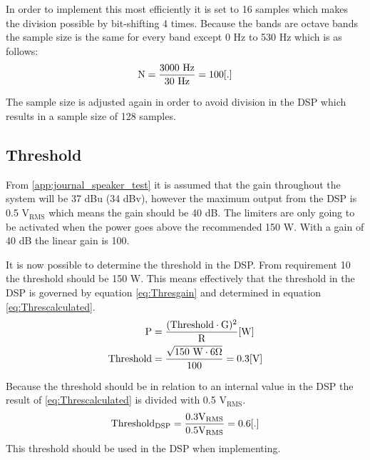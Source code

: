 In order to implement this most efficiently it is set to 16 samples which makes the division possible by bit-shifting 4 times. Because the bands are octave bands the sample size is the same for every band except 0 Hz to 530 Hz which is as follows:
\begin{equation}
\text{N} = \frac{3000 \text{ Hz}}{30 \text{ Hz}} = 100 \enhed{.}
\end{equation}

The sample size is adjusted again in order to avoid division in the DSP which results in a sample size of 128 samples. 

\subsection*{Threshold}
From \autoref{app:journal_speaker_test} it is assumed that the gain throughout the system will be 37 dBu (34 dBv), however the maximum output from the DSP is 0.5 $\text{V}_\text{RMS}$ which means the gain should be 40 dB. The limiters are only going to be activated when the power goes above the recommended 150 W. With a gain of 40 dB the linear gain is 100.

It is now possible to determine the threshold in the DSP. From requirement 10 the threshold should be 150 W.  This means effectively that the threshold in the DSP is governed by equation \ref{eq:Thresgain} and determined in equation \ref{eq:Threscalculated}.
\vspace{-3mm}
\begin{align}
\text{P}&=\frac{(\text{Threshold} \cdot \text{G})^2}{\text{R}} \enhed{W}\label{eq:Thresgain}
\\
\text{\text{Threshold}}&=\frac{\sqrt{150 \text{ W} \cdot 6 \Omega }}{100}=0.3\enhed{V}\label{eq:Threscalculated}
\end{align}
\begin{where}
\end{where}

Because the threshold should be in relation to an internal value in the DSP the result of \autoref{eq:Threscalculated} is divided with 0.5 $\text{V}_\text{RMS}$.
\begin{equation}
\text{Threshold}_\text{DSP}= \frac{0.3 \text{V}_\text{RMS}}{0.5 \text{V}_\text{RMS}} = 0.6 \enhed{.}
\end{equation}
This threshold should be used in the DSP when implementing.


